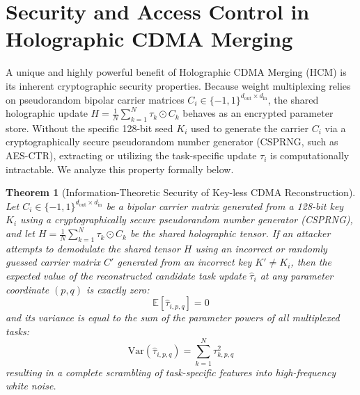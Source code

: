 \documentclass{article}
\newtheorem{theorem}{Theorem}
\begin{document}



\newpage
\appendix
\onecolumn
\section{Security and Access Control in Holographic CDMA Merging}
\label{sec:security_appendix}

A unique and highly powerful benefit of Holographic CDMA Merging (HCM) is its inherent cryptographic security properties. Because weight multiplexing relies on pseudorandom bipolar carrier matrices $C_i \in \{-1, 1\}^{d_{\text{out}} \times d_{\text{in}}}$, the shared holographic update $H = \frac{1}{N} \sum_{k=1}^N \tau_k \odot C_k$ behaves as an encrypted parameter store. Without the specific 128-bit seed $K_i$ used to generate the carrier $C_i$ via a cryptographically secure pseudorandom number generator (CSPRNG, such as AES-CTR), extracting or utilizing the task-specific update $\tau_i$ is computationally intractable. We analyze this property formally below.

\begin{theorem}[Information-Theoretic Security of Key-less CDMA Reconstruction]
Let $C_i \in \{-1, 1\}^{d_{\text{out}} \times d_{\text{in}}}$ be a bipolar carrier matrix generated from a 128-bit key $K_i$ using a cryptographically secure pseudorandom number generator (CSPRNG), and let $H = \frac{1}{N} \sum_{k=1}^N \tau_k \odot C_k$ be the shared holographic tensor. 
If an attacker attempts to demodulate the shared tensor $H$ using an incorrect or randomly guessed carrier matrix $C'$ generated from an incorrect key $K' \neq K_i$, then the expected value of the reconstructed candidate task update $\hat{\tau}_{i}$ at any parameter coordinate $(p, q)$ is exactly zero:
\begin{equation}
    \mathbb{E}[\hat{\tau}_{i, p, q}] = 0
\end{equation}
and its variance is equal to the sum of the parameter powers of all multiplexed tasks:
\begin{equation}
    \text{Var}(\hat{\tau}_{i, p, q}) = \sum_{k=1}^N \tau_{k, p, q}^2
\end{equation}
resulting in a complete scrambling of task-specific features into high-frequency white noise.
\end{theorem}
\end{document}
